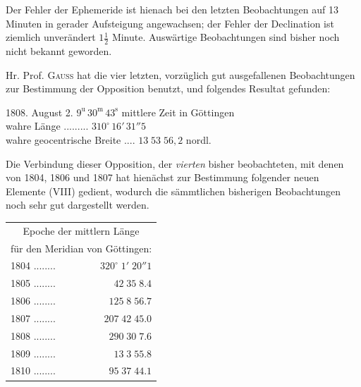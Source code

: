 \par\indent Der Fehler der Ephemeride ist hienach bei den letzten Beobachtungen auf 13 Minuten in gerader Aufsteigung angewachsen; der Fehler der Declination ist ziemlich unverändert $1\frac{1}{2}$ Minute. Auswärtige Beobachtungen sind bisher noch nicht bekannt geworden.

\par\indent Hr. Prof. \textsc{Gauss} hat die vier letzten, vorzüglich gut ausgefallenen Beobachtungen zur Bestimmung der Opposition benutzt, und folgendes Resultat gefunden:

\begin{center}
1808. August 2. $9^{\text{u}}\,30^{\text{m}}\,43^{\text{s}}$ mittlere Zeit in Göttingen\\
wahre Länge .\;.\;.\;.\;.\;.\;.\;.\;.\; $310^\circ\,16'\,31''5$\\
wahre geocentrische Breite .\;.\;.\;.\; $13\;53\;56,2$ nordl.
\end{center}

\par\indent Die Verbindung dieser Opposition, der \emph{vierten} bisher beobachteten, mit denen von 1804, 1806 und
1807 hat hienächst zur Bestimmung folgender neuen Elemente (VIII) gedient, wodurch die sämmtlichen
bisherigen Beobachtungen noch sehr gut dargestellt werden.


\begin{center}\fontsize{10}{12}\selectfont\setlength{\tabcolsep}{3pt}\renewcommand{\arraystretch}{1.15}\begin{tabular}{lr}
\multicolumn{2}{c}{Epoche der mittlern Länge}\\
\multicolumn{2}{c}{für den Meridian von Göttingen:}\\\hline
1804 .\;.\;.\;.\;.\;.\;.\;.\; & $320^\circ\;1'\;20''1$\\
1805 .\;.\;.\;.\;.\;.\;.\;.\; & $42\;35\;8.4$\\
1806 .\;.\;.\;.\;.\;.\;.\;.\; & $125\;8\;56.7$\\
1807 .\;.\;.\;.\;.\;.\;.\;.\; & $207\;42\;45.0$\\
1808 .\;.\;.\;.\;.\;.\;.\;.\; & $290\;30\;7.6$\\
1809 .\;.\;.\;.\;.\;.\;.\;.\; & $13\;3\;55.8$\\
1810 .\;.\;.\;.\;.\;.\;.\;.\; & $95\;37\;44.1$\\
\end{tabular}\end{center}

